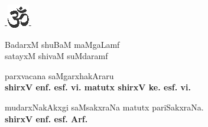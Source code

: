 \bigskip

\begin{center}
-\includegraphics{om.eps}-
\end{center}

\begin{center}
BadarxM shuBaM maMgaLamf\\
satayxM shivaM suMdaramf
\end{center}

\begin{flushright}
parxvacana saMgarxhakAraru\\[4pt]
{\bf shirxV enf. esf. vi. matutx shirxV ke. esf. vi.}
\end{flushright}

\begin{flushleft}
mudarxNakAkxgi saMsakxraNa matutx pariSakxraNa.\\
{\bf shirxV enf. esf. Arf.}
\end{flushleft}

